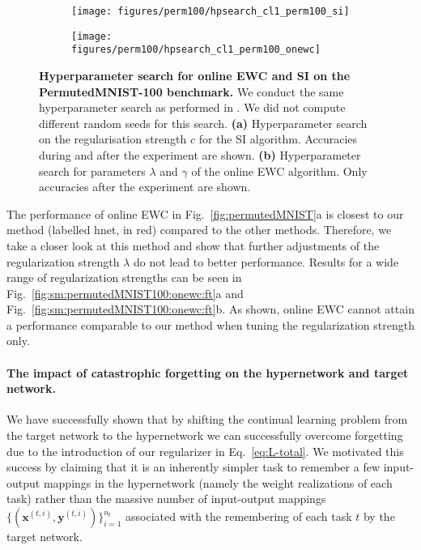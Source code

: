 \documentclass{article}
\begin{document}
\begin{figure}
    \centering
    \begin{subfigure}{0.49\linewidth}
    \caption{}
    \texttt{[image: figures/perm100/hpsearch\_cl1\_perm100\_si]}
    \end{subfigure}
    \begin{subfigure}{0.49\linewidth}
    \caption{}
    \texttt{[image: figures/perm100/hpsearch\_cl1\_perm100\_onewc]}
    \end{subfigure}
    \caption{\textbf{Hyperparameter search for online EWC and SI on the PermutedMNIST-100 benchmark.} We conduct the same hyperparameter search as performed in \cite{van_de_ven_generative_2018}. We did not compute different random seeds for this search. \textbf{(a)} Hyperparameter search on the regularisation strength $c$ for the SI algorithm. Accuracies during and after the experiment are shown. \textbf{(b)} Hyperparameter search for parameters $\lambda$ and $\gamma$ of the online EWC algorithm. 
    Only accuracies after the experiment are shown.
    \label{fig:hp_serch_p100}}
\end{figure}

The performance of online EWC in Fig.~\ref{fig:permutedMNIST}a is closest to our method (labelled hnet, in red) compared to the other methods. Therefore, we take a closer look at this method and show that further adjustments of the regularization strength $\lambda$ do not lead to better performance. Results for a wide range of regularization strengths can be seen in Fig.~\ref{fig:sm:permutedMNIST100:onewc:ft}a and Fig.~\ref{fig:sm:permutedMNIST100:onewc:ft}b. As shown, online EWC cannot attain a performance comparable to our method when tuning the regularization strength only.

\paragraph{The impact of catastrophic forgetting on the hypernetwork and target network.} We have successfully shown that by shifting the continual learning problem from the target network to the hypernetwork we can successfully overcome forgetting due to the introduction of our regularizer in Eq.~\ref{eq:L-total}. We motivated this success by claiming that it is an inherently simpler task to remember a few input-output mappings in the hypernetwork (namely the weight realizations of each task) rather than the massive number of input-output mappings $\{( \mathbf{x}^{(t,i)}, \mathbf{y}^{(t,i)} )\}_{i=1}^{n_t}$ associated with the remembering of each task $t$ by the target network.
\end{document}
